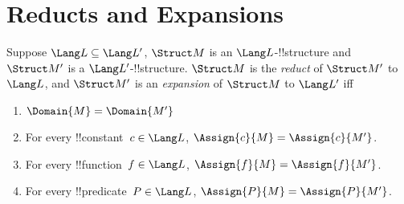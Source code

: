 \documentclass[../../include/open-logic-section]{subfiles}
\begin{document}
\section{Reducts and Expansions}

\begin{defn}
Suppose $\Lang L \subseteq \Lang L'$, $\Struct M$ is an
$\Lang L$-!!{structure} and $\Struct M'$ is a $\Lang L'$-!!{structure}.
$\Struct M$ is the \emph{reduct} of $\Struct M'$ to $\Lang L$, and
$\Struct M'$ is an \emph{expansion} of $\Struct M$ to $\Lang L'$ iff
\begin{enumerate}
\item $\Domain{M} = \Domain{M'}$
\item For every !!{constant}~$c \in \Lang L$, $\Assign{c}{M} =
  \Assign{c}{M'}$.
\item For every !!{function}~$f \in \Lang L$, $\Assign{f}{M} =
  \Assign{f}{M'}$.
\item For every !!{predicate}~$P \in \Lang L$, $\Assign{P}{M} =
  \Assign{P}{M'}$.
\end{enumerate}
\end{defn}

\end{document}
